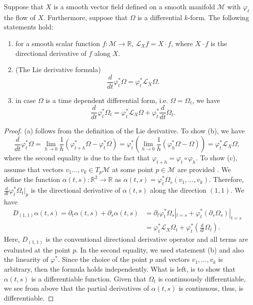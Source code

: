 \begin{theorem} \label{theorem:2.3}
Suppose that $X$ is a smooth vector field defined on a smooth manifold $\mathcal M$ with $\varphi_t$ the flow of $X$. Furthermore, suppose that $\Omega$ is a differential $k$-form. The following statements hold:
\begin{enumerate} [label=(\alph*)]
\item for a smooth scalar function $f:\mathcal M \to \mathbb R$, $\mathcal L_X f = X\cdot f$, where $X \cdot f$ is the directional derivative of $f$ along $X$.
\item (The Lie derivative formula)
\[
	\frac{d}{dt} \varphi^*_t \Omega = \varphi^*_t \mathcal L_X \Omega.
\]
\item in case $\Omega$ is a time dependent differential form, i.e. $\Omega = \Omega_t$, we have
\[
	\frac{d}{dt} \varphi^*_t \Omega_t = \varphi^*_t \mathcal L_X \Omega + \varphi^*_t \frac{d}{dt} \Omega_t.
\]
\end{enumerate}
\end{theorem}
\begin{proof}
(a) follows from the definition of the Lie derivative. To show (b), we have
\begin{equation} \label{eq:2.11}
	\frac{d}{dt} \varphi^*_t \Omega = \lim_{h\to 0} \frac 1 h( \varphi^*_{t+h} \Omega - \varphi^*_t \Omega ) = \varphi^*_t (\lim_{h\to 0} \frac 1 h (\varphi^*_{h} \Omega - \Omega) ) = \varphi^*_t \mathcal L_X \Omega,
\end{equation}
where the second equality is due to the fact that $\varphi_{t+h} = \varphi_t \circ \varphi_h$. To show (c), assume that vectors $v_1\dots,v_k\in T_{p}\mathcal M$ at some point $p\in \mathcal M$ are provided . We define the function $\alpha(t,s):\mathbb R^2 \to \mathbb R$ as $\alpha(t,s) = \varphi_t^*\Omega_s(v_1,\dots,v_k)$. Therefore, $\frac{d}{dt} \varphi^*_t \Omega_t|_p$ is the directional derivative of $\alpha(t,s)$ along the direction $(1,1)$. We have
\begin{equation} \label{eq:2.12}
\begin{aligned}
	D_{(1,1)} \alpha(t,s) = \partial_t \alpha(t,s) + \partial_s  \alpha(t,s) &= \partial_t \varphi^*_t \Omega_s|_{t=s} + \varphi^*_t (\partial_s \Omega_s)|_{t=s} \\
	&= \varphi^*_t \mathcal L_X \Omega_t + \varphi^*_t (\frac{d}{dt} \Omega_t).
\end{aligned}
\end{equation}
Here, $D_{(1,1)}$ is the conventional directional derivative operator and all terms are evaluated at the point $p$. In the second equality, we used statement (b) and also the linearity of $\varphi^*$. Since the choice of the point $p$ and vectors $v_1,\dots,v_k$ is arbitrary, then the formula holds independently. What is left, is to show that $\alpha(t,s)$ is a differentiable function. Given that $\Omega_t$ is continuously differentiable, we see from above that the partial derivatives of $\alpha(t,s)$ is continuous, thus, is differentiable. 
\end{proof}

